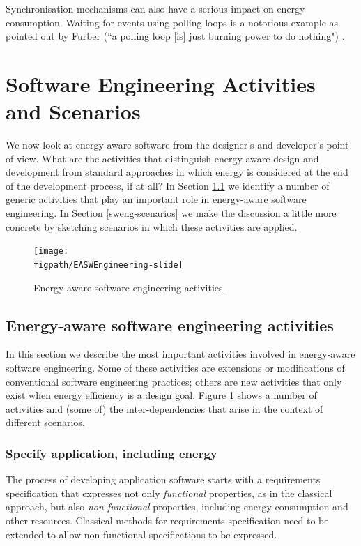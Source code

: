 \documentclass[oneside]{book}
\begin{document}
Synchronisation mechanisms can also have a serious impact on energy consumption. Waiting for events using polling loops is a notorious example as pointed out by Furber (``a polling loop [is] just burning power to do nothing") \cite{Furber2016}.





\section{Software Engineering Activities and Scenarios}
\label{ea-sw-eng}


We now look at energy-aware software from the designer's and developer's point of view.
What are the activities that distinguish energy-aware design and development from
standard approaches in which energy is considered at the end of the development process, if at all?
In Section \ref{sweng-activities} we identify a number of generic activities that play an
important role in energy-aware software engineering.  In Section \ref{sweng-scenarios} we make the discussion
a little more concrete by sketching scenarios in which these activities are applied.
\begin{figure}
\centerline{\texttt{[image: \\figpath/EASWEngineering-slide]}}
\vspace{-1.5cm}
\caption{Energy-aware software engineering activities.}
\label{fig:EASWEngineering}
\end{figure}


\subsection{Energy-aware software engineering activities}\label{sweng-activities}

In this section we describe the most important activities involved in
energy-aware software engineering.  Some of these activities are
extensions or modifications of conventional software engineering
practices; others are new activities that only exist when energy
efficiency is a design goal.  Figure \ref{fig:EASWEngineering} shows a
number of activities and (some of) the inter-dependencies that arise
in the context of different scenarios.

\subsubsection{Specify application, including energy}
The process of developing application software starts with a
requirements specification that expresses not only \emph{functional} properties, as
in the classical approach, but also \emph{non-functional} properties,
including energy consumption and other resources.  Classical
methods for requirements specification need to be extended to allow
non-functional specifications to be expressed. 
\end{document}
